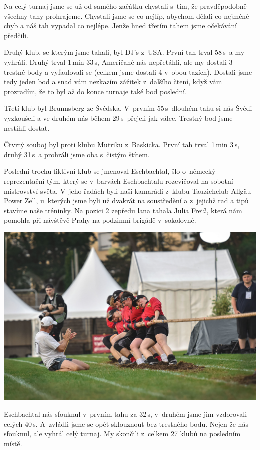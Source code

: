 \documentclass[11pt]{article}
\begin{document}
Na celý turnaj jsme se už od samého začátku chystali s~tím, že pravděpodobně všechny tahy prohrajeme. Chystali jsme se co nejlíp, abychom dělali co nejméně chyb a náš tah vypadal co nejlépe. Jenže hned třetím tahem jsme očekávání předčili.

Druhý klub, se kterým jsme tahali, byl DJ's z~USA.
První tah trval 58\,s~a my vyhráli. Druhý trval 1\,min 33\,s, Američané nás nepřetáhli, ale my dostali 3 trestné body a vyfaulovali se (celkem jsme dostali 4 v~obou tazích). Dostali jsme tedy jeden bod a snad vám nezkazím zážitek z~dalšího čtení, když vám prozradím, že to byl až do konce turnaje také bod poslední.

Třetí klub byl Brunnsberg ze Švédska. V~prvním 55\,s~dlouhém tahu si nás Švédi vyzkoušeli a ve druhém nás během 29\,s~přejeli jak válec. Trestný bod jsme nestihli dostat.

Čtvrtý souboj byl proti klubu Mutriku z~Baskicka. První tah trval 1\,min 3\,s, druhý 31\,s~a prohráli jsme oba s~čistým štítem.

Poslední trochu fiktivní klub se jmenoval Eschbachtal, šlo o~německý reprezentační tým, který se v~barvách Eschbachtalu rozcvičoval na sobotní mistrovství světa. V~jeho řadách byli naši kamarádi z~klubu Tauziehclub Allgäu Power Zell, u~kterých jsme byli už dvakrát na soustředění a z~jejichž rad a tipů stavíme naše tréninky. Na pozici 2 zepředu lana tahala Julia Freiß, která nám pomohla při návštěvě Prahy na podzimní brigádě v~sokolovně.

\begin{center}
  \includegraphics[width=\linewidth]{./lano-de.jpg}
\end{center}

Eschbachtal nás sfouknul v~prvním tahu za 32\,s, v~druhém jsme jim vzdorovali celých 40\,s. A~zvládli jsme se opět sklouznout bez trestného bodu. Nejen že nás sfouknul, ale vyhrál celý turnaj. My skončili z~celkem 27 klubů na posledním místě.
\end{document}

